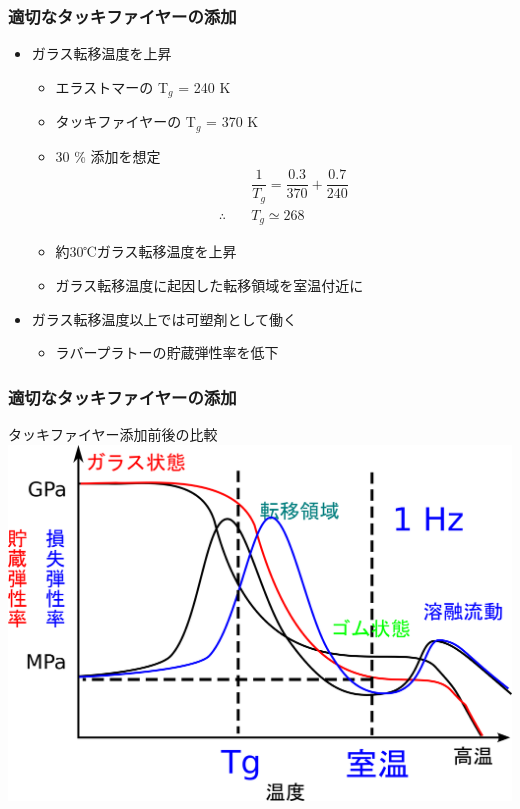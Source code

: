 \documentclass[12pt, dvipdfmx]{beamer}
\begin{document}
\begin{frame}
	\frametitle{適切なタッキファイヤーの添加}

	\begin{itemize}
		\item ガラス転移温度を上昇
		\begin{itemize}
			\item エラストマーの T$_g$ = 240 K
			\item タッキファイヤーの T$_g$ = 370 K
			\item 30 \% 添加を想定
			\begin{align*}
				&\dfrac{1}{T_g} = \dfrac{0.3}{370} + \dfrac{0.7}{240} \\
				\therefore \quad &T_g \simeq 268
			\end{align*}
			\item 約30℃ガラス転移温度を上昇
			\item ガラス転移温度に起因した\alert{転移領域を室温付近}に
		\end{itemize}
		\item \alert{ガラス転移温度以上では可塑剤}として働く
		\begin{itemize}
			\item ラバープラトーの\alert{貯蔵弾性率を低下}
		\end{itemize}
	\end{itemize}
\end{frame}

\begin{frame}
	\frametitle{適切なタッキファイヤーの添加}
		\large{\alert{タッキファイヤー添加前後の比較}}
		\vspace{5mm}
			\centering
				\includegraphics[width=.8\textwidth]{dynamic_ViscoElast_Temp_rubber_tack.png}
\end{frame}
\end{document}
